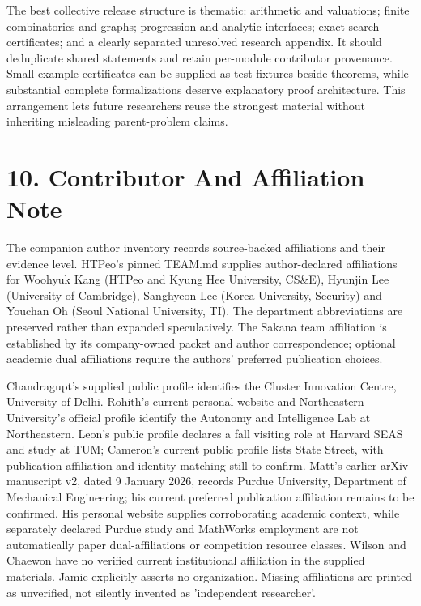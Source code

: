 \documentclass[11pt,a4paper]{article}
\begin{document}
The best collective release structure is thematic: arithmetic and valuations; finite combinatorics and graphs; progression and analytic interfaces; exact search certificates; and a clearly separated unresolved research appendix. It should deduplicate shared statements and retain per-module contributor provenance. Small example certificates can be supplied as test fixtures beside theorems, while substantial complete formalizations deserve explanatory proof architecture. This arrangement lets future researchers reuse the strongest material without inheriting misleading parent-problem claims.

\section{10. Contributor And Affiliation Note}
The companion author inventory records source-backed affiliations and their evidence level. HTPeo's pinned TEAM.md supplies author-declared affiliations for Woohyuk Kang (HTPeo and Kyung Hee University, CS\&E), Hyunjin Lee (University of Cambridge), Sanghyeon Lee (Korea University, Security) and Youchan Oh (Seoul National University, TI). The department abbreviations are preserved rather than expanded speculatively. The Sakana team affiliation is established by its company-owned packet and author correspondence; optional academic dual affiliations require the authors' preferred publication choices.

Chandragupt's supplied public profile identifies the Cluster Innovation Centre, University of Delhi. Rohith's current personal website and Northeastern University's official profile identify the Autonomy and Intelligence Lab at Northeastern. Leon's public profile declares a fall visiting role at Harvard SEAS and study at TUM; Cameron's current public profile lists State Street, with publication affiliation and identity matching still to confirm. Matt's earlier arXiv manuscript v2, dated 9 January 2026, records Purdue University, Department of Mechanical Engineering; his current preferred publication affiliation remains to be confirmed. His personal website supplies corroborating academic context, while separately declared Purdue study and MathWorks employment are not automatically paper dual-affiliations or competition resource classes. Wilson and Chaewon have no verified current institutional affiliation in the supplied materials. Jamie explicitly asserts no organization. Missing affiliations are printed as unverified, not silently invented as 'independent researcher'.
\end{document}
